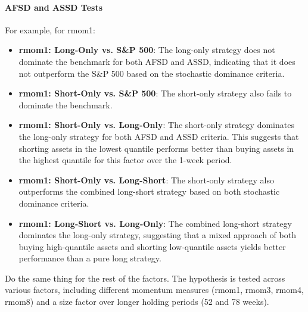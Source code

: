 \documentclass{article}
\begin{document}
\paragraph{AFSD and ASSD Tests}
For example, for rmom1:
\begin{itemize}
    \item \textbf{rmom1: Long-Only vs. S\&P 500}: The long-only strategy does not dominate the benchmark for both AFSD and ASSD, indicating that it does not outperform the S\&P 500 based on the stochastic dominance criteria.
    \item \textbf{rmom1: Short-Only vs. S\&P 500}: The short-only strategy also fails to dominate the benchmark.
    \item \textbf{rmom1: Short-Only vs. Long-Only}: The short-only strategy dominates the long-only strategy for both AFSD and ASSD criteria. This suggests that shorting assets in the lowest quantile performs better than buying assets in the highest quantile for this factor over the 1-week period.
    \item \textbf{rmom1: Short-Only vs. Long-Short}: The short-only strategy also outperforms the combined long-short strategy based on both stochastic dominance criteria.
    \item \textbf{rmom1: Long-Short vs. Long-Only}: The combined long-short strategy dominates the long-only strategy, suggesting that a mixed approach of both buying high-quantile assets and shorting low-quantile assets yields better performance than a pure long strategy.
\end{itemize}

Do the same thing for the rest of the factors. The hypothesis is tested across various factors, including different momentum measures (rmom1, rmom3, rmom4, rmom8) and a size factor over longer holding periods (52 and 78 weeks).
\end{document}
